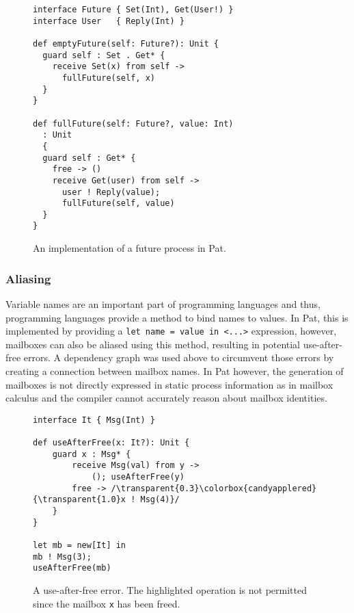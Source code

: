 \begin{wrapfigure}{r}{0.5\textwidth}
\vspace{-20pt} %
\begin{lstlisting}
interface Future { Set(Int), Get(User!) }
interface User   { Reply(Int) }

def emptyFuture(self: Future?): Unit {
  guard self : Set . Get* {
    receive Set(x) from self ->
      fullFuture(self, x)
  }
}

def fullFuture(self: Future?, value: Int)
  : Unit
  {
  guard self : Get* {
    free -> ()
    receive Get(user) from self ->
      user ! Reply(value);
      fullFuture(self, value)
  }
}
\end{lstlisting}
\caption{An implementation of a future process in Pat.\cite{fowlerPatCheckerGithub2025}}
\label{lst:futurePat}
\vspace{-20pt} %


\end{wrapfigure}

\subsubsection{Aliasing}

Variable names are an important part of programming languages and thus, programming languages provide a method to bind names to values. In Pat, this is implemented by providing a \lstinline|let name = value in <...>| expression, however, mailboxes can also be aliased using this method, resulting in potential use-after-free errors. A dependency graph was used above to circumvent those errors by creating a connection between mailbox names. In Pat however, the generation of mailboxes is not directly expressed in static process information as in mailbox calculus and the compiler cannot accurately reason about mailbox identities.

\begin{wrapfigure}{l}{0.4\textwidth}
\begin{lstlisting}[escapechar=/]
interface It { Msg(Int) }

def useAfterFree(x: It?): Unit {
    guard x : Msg* {
        receive Msg(val) from y ->
            (); useAfterFree(y)
        free -> /\transparent{0.3}\colorbox{candyapplered}{\transparent{1.0}x ! Msg(4)}/
    }
}

let mb = new[It] in
mb ! Msg(3);
useAfterFree(mb)
\end{lstlisting}
\caption{A use-after-free error. The highlighted operation is not permitted since the mailbox \lstinline|x| has been freed.\cite{fowlerSpecialDeliveryProgramming2023}}
\label{lst:patUseAfterFree}
\vspace{-00pt}
\end{wrapfigure}

